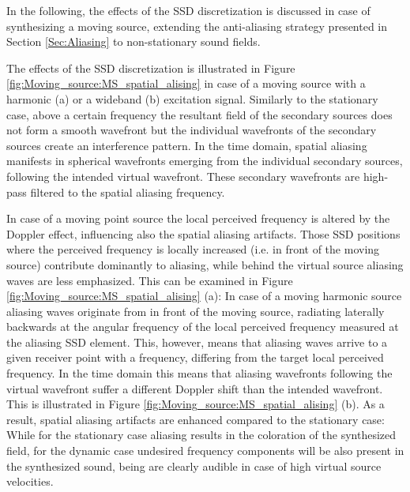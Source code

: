 In the following, the effects of the SSD discretization is discussed in case of synthesizing a moving source, extending the anti-aliasing strategy presented in Section \ref{Sec:Aliasing} to non-stationary sound fields.

The effects of the SSD discretization is illustrated in Figure \ref{fig:Moving_source:MS_spatial_alising} in case of a moving source with a harmonic (a) or a wideband (b) excitation signal.
Similarly to the stationary case, above a certain frequency the resultant field of the secondary sources does not form a smooth wavefront but the individual wavefronts of the secondary sources create an interference pattern.
In the time domain, spatial aliasing manifests in spherical wavefronts emerging from the individual secondary sources, following the intended virtual wavefront.
These secondary wavefronts are high-pass filtered to the spatial aliasing frequency.

In case of a moving point source the local perceived frequency is altered by the Doppler effect, influencing also the spatial aliasing artifacts.
Those SSD positions where the perceived frequency is locally increased (i.e. in front of the moving source) contribute dominantly to aliasing, while behind the virtual source aliasing waves are less emphasized.
This can be examined in Figure \ref{fig:Moving_source:MS_spatial_alising} (a): 
In case of a moving harmonic source aliasing waves originate from in front of the moving source, radiating laterally backwards at the angular frequency of the local perceived frequency measured at the aliasing SSD element.
This, however, means that aliasing waves arrive to a given receiver point with a frequency, differing from the target local perceived frequency.
In the time domain this means that aliasing wavefronts following the virtual wavefront suffer a different Doppler shift than the intended wavefront.
This is illustrated in Figure \ref{fig:Moving_source:MS_spatial_alising} (b).
As a result, spatial aliasing artifacts are enhanced compared to the stationary case: 
While for the stationary case aliasing results in the coloration of the synthesized field, for the dynamic case undesired frequency components will be also present in the synthesized sound, being are clearly audible in case of high virtual source velocities.


